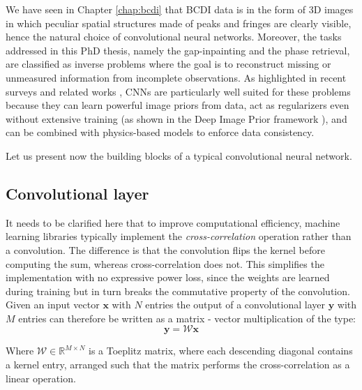 We have seen in Chapter \ref{chap:bcdi} that BCDI data is in the form of 3D images in which peculiar spatial structures 
made of peaks and fringes are clearly visible, hence the natural choice of convolutional neural networks. Moreover, the 
tasks addressed in this PhD thesis, namely the gap-inpainting and the phase retrieval, are classified as inverse problems 
where the goal is to reconstruct missing or unmeasured information from incomplete observations. As highlighted in recent 
surveys and related works \cite{Review_CNN_2020, CNN_inverse2017}, CNNs are particularly well suited for these problems 
because they can learn powerful image priors from data, act as regularizers even without extensive training 
(as shown in the Deep Image Prior framework \cite{Ulyanov_2020}), and can be combined with physics-based models to 
enforce data consistency.

Let us present now the building blocks of a typical convolutional neural network.

\subsection{Convolutional layer}

It needs to be clarified here that to improve computational efficiency, machine learning libraries typically implement 
the \textit{cross-correlation} operation rather than a convolution. The difference is that the convolution flips the kernel before 
computing the sum, whereas cross-correlation does not. This simplifies the implementation with no expressive power loss, 
since the weights are learned during training but in turn breaks the commutative property of the convolution. 
Given an input vector $\mathbf{x}$ with $N$ entries the 
output of a convolutional layer $\mathbf{y}$ with $M$ entries can therefore be written as a matrix - vector multiplication of 
the type: 
\begin{equation}
    \mathbf{y} = \mathcal W \mathbf{x}
    \label{eq:conv_op} 
\end{equation}

Where $\mathcal W \in \mathbb{R}^{M \times N}$ is a Toeplitz matrix, where each descending diagonal contains a kernel entry, 
arranged such that the matrix performs the cross-correlation as a linear operation.

